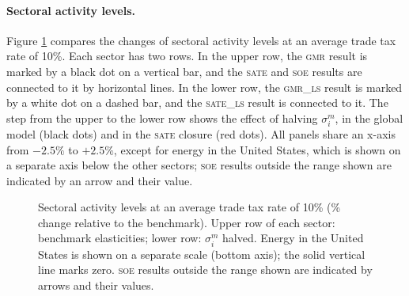 \documentclass{jgea}
\newcommand{\SOE}{\textsc{soe}\xspace}
\newcommand{\SATE}{\textsc{sate}\xspace}
\newcommand{\GMR}{\textsc{gmr}\xspace}
\newcommand{\GMRLS}{\textsc{gmr\_ls}\xspace}
\newcommand{\SATELS}{\textsc{sate\_ls}\xspace}
\begin{document}
\paragraph{\bf Sectoral activity levels.}
Figure \ref{fig:sec} compares the changes of sectoral activity levels at an average trade tax rate of 10\%.
Each sector has two rows.
In the upper row, the \GMR result is marked by a black dot on a vertical bar, and the \SATE and \SOE results are connected to it by horizontal lines.
In the lower row, the \GMRLS result is marked by a white dot on a dashed bar, and the \SATELS result is connected to it.
The step from the upper to the lower row shows the effect of halving $\sigma^m_i$, in the global model (black dots) and in the \SATE closure (red dots).
All panels share an x-axis from $-2.5\%$ to $+2.5\%$, except for energy in the United States, which is shown on a separate axis below the other sectors; \SOE results outside the range shown are indicated by an arrow and their value.

\begin{figure}[p!]
\centering
\hfill


\vspace{0.1in}
\hfill


\caption{Sectoral activity levels at an average trade tax rate of 10\% (\% change relative to the benchmark).
Upper row of each sector: benchmark elasticities; lower row: $\sigma^m_i$ halved.
Energy in the United States is shown on a separate scale (bottom axis); the solid vertical line marks zero.
\SOE results outside the range shown are indicated by arrows and their values.}\label{fig:sec}
\end{figure}
\end{document}
